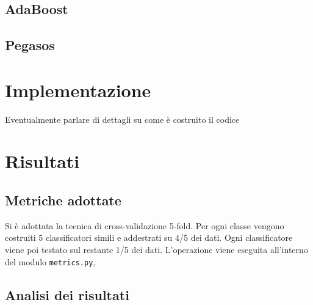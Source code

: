 \documentclass[11pt,a4paper]{report}
\begin{document}
\section{AdaBoost}
\section{Pegasos}

\chapter{Implementazione}
Eventualmente parlare di dettagli su come è costruito il codice
\chapter{Risultati}
\section{Metriche adottate}
Si è adottata la tecnica di cross-validazione 5-fold. Per ogni classe vengono costruiti 5 classificatori simili e addestrati su 4/5 dei dati. Ogni classificatore viene poi testato sul restante 1/5 dei dati.
L'operazione viene eseguita all'interno del modulo \texttt{metrics.py}, 
\section{Analisi dei risultati}
\end{document}
